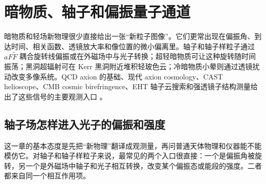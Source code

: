 \chapter{暗物质、轴子和偏振量子通道}
\label{chap:15}

\begin{chapteropening}
暗物质和轻场新物理很少直接给出一张“新粒子图像”。它们更常出现在偏振角、到达时间、相关函数、透镜放大率和像位置的微小偏离里。轴子和轴子样粒子通过 \(aF\tilde F\) 耦合旋转线偏振或在外磁场中与光子转换；超轻暗物质可让这种旋转随时间振荡；黑洞超辐射可在 Kerr 黑洞附近堆积轻玻色云；冷暗物质小晕则通过透镜扰动改变多像系统。QCD axion 的基础、现代 axion cosmology、CAST helioscope、CMB cosmic birefringence、EHT 轴子云搜索和强透镜子结构测量给出了这些信号的主要观测入口 \citep{1977PhRvL..38.1440P,1978PhRvL..40..223W,1978PhRvL..40..279W,1983PhRvL..51.1415S,2016PhR...643....1M,2017NatPh..13..584C,1990PhRvD..41.1231C,1999PhRvL..83.1506L,2020PhRvL.125v1301M,2022NatRP...4..452K,2020PhRvL.124f1102C,2022NatAs...6..592C,1998MNRAS.295..587M,2002ApJ...572...25D}。
\end{chapteropening}

\section{轴子场怎样进入光子的偏振和强度}

这一章的基本态度是先把“新物理”翻译成观测量，再问普通天体物理和仪器能不能模仿它。对轴子和轴子样粒子来说，最常见的两个入口很直接：一个是偏振角被旋转，另一个是外磁场中轴子和光子相互转换，改变某个偏振态或能段的强度。二者都来自同一个相互作用项。


